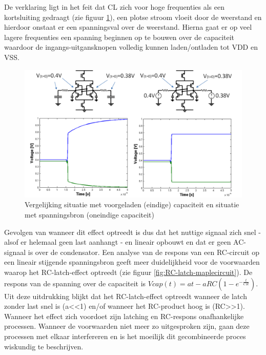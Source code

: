 De verklaring ligt in het feit dat CL zich voor hoge frequenties als een kortsluiting gedraagt (zie figuur \ref{fig:RC-latch-explain}), een plotse stroom vloeit door de weerstand en hierdoor onstaat er een spanningsval over de weerstand. Hierna gaat er op veel lagere frequenties een spanning beginnen op te bouwen over de capaciteit waardoor de ingangs-uitgansknopen volledig kunnen laden/ontladen tot VDD en VSS.
\begin{figure}
  \centering
  \includegraphics[width=\textwidth]{../fig/hfdstk-sensamp-RC-latch-explain.png}
  \caption{Vergelijking situatie met voorgeladen (eindige) capaciteit en situatie met spanningsbron (oneindige capaciteit)}
  \label{fig:RC-latch-explain}
\end{figure}
Gevolgen van wanneer dit effect optreedt is dus dat het nuttige signaal zich snel - alsof er helemaal geen last aanhangt - en lineair opbouwt en dat er geen AC-signaal is over de condensator. Een analyse van de respons van een RC-circuit op een lineair stijgende spanningsbron geeft meer duidelijkheid voor de voorwaarden waarop het RC-latch-effect optreedt (zie figuur \ref{fig:RC-latch-maplecircuit}). De respons van de spanning over de capaciteit is $Vcap(t) =  at - aRC(1-e^{-{\frac {t}{CR}}})$. Uit deze uitdrukking blijkt dat het RC-latch-effect optreedt wanneer de latch zonder last snel is (a<<1) en/of wanneer het RC-product hoog is (RC>>1).
Wanneer het effect zich voordoet zijn latching en RC-respons onafhankelijke processen. Wanneer de voorwaarden niet meer zo uitgesproken zijn, gaan deze processen met elkaar interfereren en is het moeilijk dit gecombineerde proces wiskundig te beschrijven.
